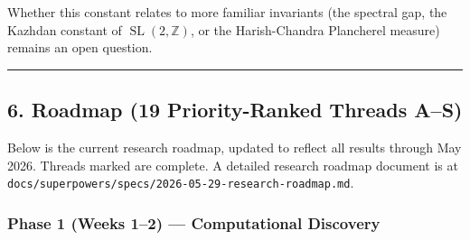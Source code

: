 \documentclass[
]{article}
\begin{document}
Whether this constant relates to more familiar invariants (the spectral
gap, the Kazhdan constant of \(\operatorname{SL}(2,\mathbb{Z})\), or the
Harish-Chandra Plancherel measure) remains an open question.

\begin{center}\rule{0.5\linewidth}{0.5pt}\end{center}

\hypertarget{roadmap-19-priority-ranked-threads-as}{%
\subsection{6. Roadmap (19 Priority-Ranked Threads
A--S)}\label{roadmap-19-priority-ranked-threads-as}}

Below is the current research roadmap, updated to reflect all results
through May 2026. Threads marked {\footnotesize{}} are complete. A detailed research
roadmap document is at
\texttt{docs/superpowers/specs/2026-05-29-research-roadmap.md}.

\hypertarget{phase-1-weeks-12-computational-discovery}{%
\subsubsection{Phase 1 (Weeks 1--2) --- Computational
Discovery}\label{phase-1-weeks-12-computational-discovery}}
\end{document}
